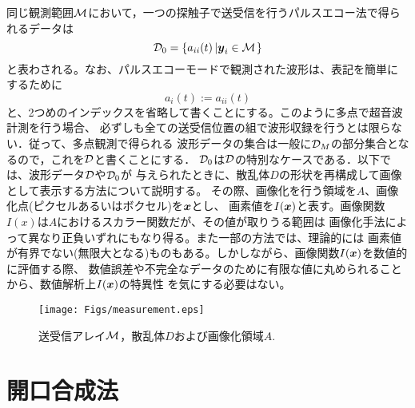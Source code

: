 \documentclass[10pt,a4j,dvipdfmx]{jarticle}
\begin{document}
同じ観測範囲$\cal M$において，一つの探触子で送受信を行うパルスエコー法で得られるデータは
\begin{equation}
	{\cal D}_0= \left\{ a_{ii}(t) \left| \mbox{\boldmath $y$}_i \in {\cal M}\right.\right\}
	\label{eqn:pulse_echo}
\end{equation}
と表わされる。なお、パルスエコーモードで観測された波形は、表記を簡単にするために
\begin{equation}
	a_i(t):=a_{ii}(t)
	\label{eqn:}
\end{equation}
と、2つめのインデックスを省略して書くことにする。このように多点で超音波計測を行う場合、
必ずしも全ての送受信位置の組で波形収録を行うとは限らない．従って、多点観測で得られる
波形データの集合は一般に${\cal D}_M$の部分集合となるので，これを$\cal D$と書くことにする．
${\cal D}_0$は$\cal D$の特別なケースである．以下では、波形データ$\cal D$や${\cal D}_0$が
与えられたときに、散乱体$D$の形状を再構成して画像として表示する方法について説明する。
その際、画像化を行う領域を$A$、画像化点(ピクセルあるいはボクセル)を$\mbox{\boldmath $x$}$とし、
画素値を$I(\mbox{\boldmath $x$})$と表す。画像関数$I(x)$は$A$におけるスカラー関数だが、その値が取りうる範囲は
画像化手法によって異なり正負いずれにもなり得る。また一部の方法では、理論的には
画素値が有界でない(無限大となる)ものもある。しかしながら、画像関数$I(\mbox{\boldmath $x$})$を数値的に評価する際、
数値誤差や不完全なデータのために有限な値に丸められることから、数値解析上$I(\mbox{\boldmath $x$})$の特異性
を気にする必要はない。
\begin{figure}[h]
	\begin{center}
	\texttt{[image: Figs/measurement.eps]} 
	\end{center}
	\caption{送受信アレイ$\cal M$，散乱体$D$および画像化領域$A$.} 
	\label{fig:arrayM}
\end{figure}
%
\section{開口合成法}
\end{document}
